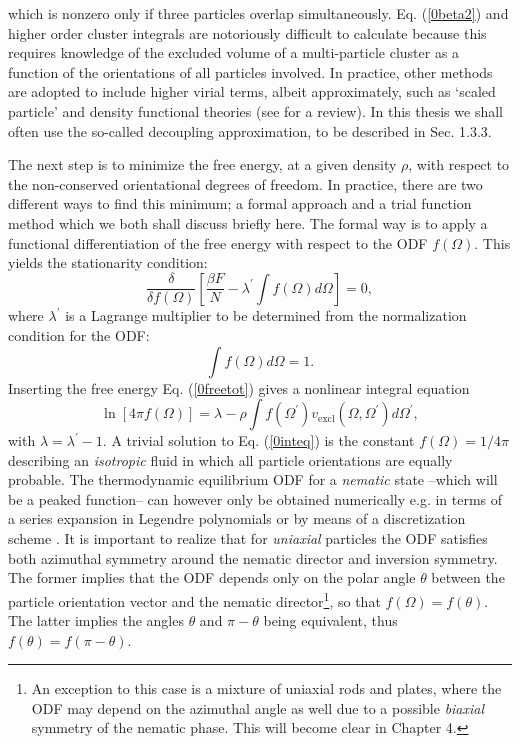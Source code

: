 \documentclass[amssymb]{revtex4}
\begin{document}
which is nonzero only if three particles overlap simultaneously.
Eq. (\ref{0beta2}) and higher order cluster integrals are notoriously difficult to calculate
because this requires knowledge of the excluded volume of a multi-particle
cluster as a function of the orientations of all particles involved. 
In practice, other methods are adopted to include higher virial terms, albeit
approximately, such as
`scaled particle' \cite{Cotterspt,Cotter} and density functional theories (see \cite{Vroege92,DFTspecialJPCM} for a review).
In this thesis we shall often use the so-called decoupling approximation, to be described 
in Sec. 1.3.3.


The next step is to minimize the free energy, at a given density $\rho$, with respect to 
the non-conserved orientational degrees of freedom. 
In practice, there are two different ways to find this minimum; a formal approach and
a trial function method which we both shall discuss briefly here.
 The formal way  is to apply a functional differentiation of the free energy
with respect to the ODF $f(\Omega)$. This yields the stationarity condition:
\begin{equation}
\frac{\delta}{\delta f(\Omega)} \left[\frac{\beta F}{N}-\lambda^{\prime} \int f(\Omega)d \Omega \right]=0,
\label{0statcond}
\end{equation}
where $\lambda^{\prime}$ is a Lagrange multiplier to be determined from the 
normalization condition for the ODF:
\begin{equation}
\int f(\Omega)d\Omega =1.
\end{equation}
Inserting the free energy Eq. (\ref{0freetot}) gives a nonlinear integral equation
\begin{equation}
\ln[4\pi f(\Omega)]=\lambda - \rho \int f(\Omega^{\prime})v_{\text{excl}}(\Omega,\Omega^{\prime})
d\Omega^{\prime}, \label{0inteq}
\end{equation}
with $\lambda=\lambda^{\prime}-1$. A trivial solution to Eq. (\ref{0inteq}) is 
the constant $f(\Omega)=1/4\pi$ describing an {\em isotropic} fluid in which
all particle orientations are equally probable.
The thermodynamic equilibrium ODF for a {\em nematic} state --which 
will be a peaked function--
can however only be obtained
 numerically e.g. in terms of a series expansion in
Legendre polynomials \cite{kayser,lasher,lakatos} or by means of a discretization scheme \cite{herzfeldgrid}.
It is important to realize that for  {\em uniaxial} particles the ODF satisfies
both azimuthal symmetry around the nematic director and inversion symmetry. 
The former implies that the ODF depends only on the  polar angle $\theta$
between the particle orientation vector and the nematic director\footnote{An exception to this case is a mixture of uniaxial rods and plates,
where the ODF may depend on the azimuthal angle as well
due to a possible {\em biaxial} symmetry of the nematic phase.
This will become clear in Chapter 4.}, so that $f(\Omega)=f(\theta)$.
The latter  implies the angles $\theta$ and $\pi-\theta$ being equivalent, thus $f(\theta)=f(\pi-\theta)$. 
\end{document}
